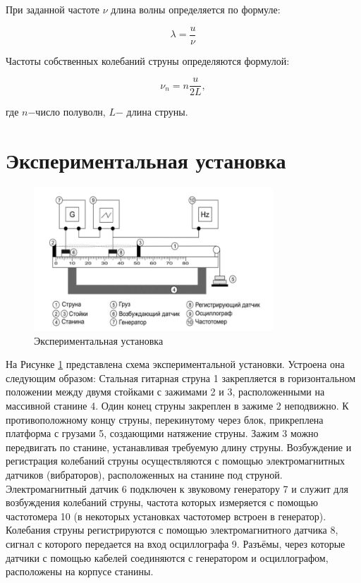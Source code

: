 \documentclass[12pt,a4paper]{article}
\begin{document}
При заданной частоте $\nu$ длина волны определяется по формуле:

\begin{equation}
	\lambda = \frac{u}{\nu}
\end{equation}

Частоты собственных колебаний струны определяются формулой:

\begin{equation}
	\nu_{n} = n\frac{u}{2L},
	\label{eq:frequency_velocity_equation}
\end{equation}

где $n$$-$число полуволн, $L$$-$ длина струны.

\section{Экспериментальная установка}

\begin{figure}[h!]
	\begin{center}
		\includegraphics[width = 0.8\textwidth]{facility}
		\caption{Экспериментальная установка}
		\label{fig:facility}
	\end{center}
\end{figure}

На Рисунке \ref{fig:facility} представлена схема экспериментальной установки. Устроена она следующим образом: Стальная гитарная струна 1 закрепляется в горизонтальном положении между двумя стойками с зажимами 2 и 3,
расположенными на массивной станине 4. Один конец струны закреплен в
зажиме 2 неподвижно. К противоположному концу струны, перекинутому через блок, прикреплена платформа с грузами 5, создающими натяжение
струны. Зажим 3 можно передвигать по станине, устанавливая требуемую
длину струны. Возбуждение и регистрация колебаний струны осуществляются с помощью электромагнитных датчиков (вибраторов), расположенных
на станине под струной. Электромагнитный датчик 6 подключен к звуковому
генератору 7 и служит для возбуждения колебаний струны, частота которых
измеряется с помощью частотомера 10 (в некоторых установках частотомер
встроен в генератор). Колебания струны регистрируются с помощью электромагнитного датчика 8, сигнал с которого передается на вход осциллографа 9.
Разъёмы, через которые датчики с помощью кабелей соединяются с генератором и осциллографом, расположены на корпусе станины.
\end{document}
